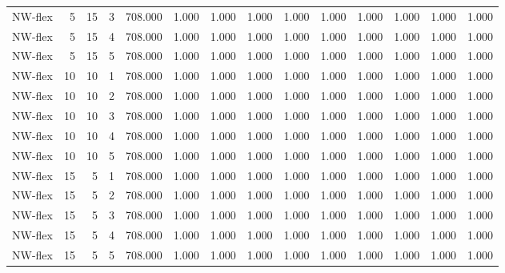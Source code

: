 \begin{table}
\begin{tabular}{lrrrrrrrrrrrrr}
NW-flex & 5 & 15 & 3 & 708.000 & 1.000 & 1.000 & 1.000 & 1.000 & 1.000 & 1.000 & 1.000 & 1.000 & 1.000 \\
NW-flex & 5 & 15 & 4 & 708.000 & 1.000 & 1.000 & 1.000 & 1.000 & 1.000 & 1.000 & 1.000 & 1.000 & 1.000 \\
NW-flex & 5 & 15 & 5 & 708.000 & 1.000 & 1.000 & 1.000 & 1.000 & 1.000 & 1.000 & 1.000 & 1.000 & 1.000 \\
NW-flex & 10 & 10 & 1 & 708.000 & 1.000 & 1.000 & 1.000 & 1.000 & 1.000 & 1.000 & 1.000 & 1.000 & 1.000 \\
NW-flex & 10 & 10 & 2 & 708.000 & 1.000 & 1.000 & 1.000 & 1.000 & 1.000 & 1.000 & 1.000 & 1.000 & 1.000 \\
NW-flex & 10 & 10 & 3 & 708.000 & 1.000 & 1.000 & 1.000 & 1.000 & 1.000 & 1.000 & 1.000 & 1.000 & 1.000 \\
NW-flex & 10 & 10 & 4 & 708.000 & 1.000 & 1.000 & 1.000 & 1.000 & 1.000 & 1.000 & 1.000 & 1.000 & 1.000 \\
NW-flex & 10 & 10 & 5 & 708.000 & 1.000 & 1.000 & 1.000 & 1.000 & 1.000 & 1.000 & 1.000 & 1.000 & 1.000 \\
NW-flex & 15 & 5 & 1 & 708.000 & 1.000 & 1.000 & 1.000 & 1.000 & 1.000 & 1.000 & 1.000 & 1.000 & 1.000 \\
NW-flex & 15 & 5 & 2 & 708.000 & 1.000 & 1.000 & 1.000 & 1.000 & 1.000 & 1.000 & 1.000 & 1.000 & 1.000 \\
NW-flex & 15 & 5 & 3 & 708.000 & 1.000 & 1.000 & 1.000 & 1.000 & 1.000 & 1.000 & 1.000 & 1.000 & 1.000 \\
NW-flex & 15 & 5 & 4 & 708.000 & 1.000 & 1.000 & 1.000 & 1.000 & 1.000 & 1.000 & 1.000 & 1.000 & 1.000 \\
NW-flex & 15 & 5 & 5 & 708.000 & 1.000 & 1.000 & 1.000 & 1.000 & 1.000 & 1.000 & 1.000 & 1.000 & 1.000 \\
\bottomrule
\end{tabular}
\end{table}
